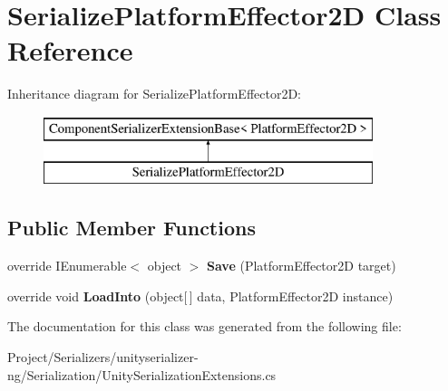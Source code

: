 \hypertarget{class_serialize_platform_effector2_d}{}\section{Serialize\+Platform\+Effector2D Class Reference}
\label{class_serialize_platform_effector2_d}
Inheritance diagram for Serialize\+Platform\+Effector2D\+:\begin{figure}[H]
\begin{center}
\leavevmode
\includegraphics[height=2.000000cm]{class_serialize_platform_effector2_d}
\end{center}
\end{figure}
\subsection*{Public Member Functions}
\begin{DoxyCompactItemize}
\item 
\mbox{\label{class_serialize_platform_effector2_d_a3cc7f3792e67702b2f2e272104353d7e}} 
override I\+Enumerable$<$ object $>$ {\bfseries Save} (Platform\+Effector2D target)
\item 
\mbox{\label{class_serialize_platform_effector2_d_a795aec6c3fcd799843a26c4d8f1520c8}} 
override void {\bfseries Load\+Into} (object\mbox{[}$\,$\mbox{]} data, Platform\+Effector2D instance)
\end{DoxyCompactItemize}


The documentation for this class was generated from the following file\+:\begin{DoxyCompactItemize}
\item 
Project/\+Serializers/unityserializer-\/ng/\+Serialization/Unity\+Serialization\+Extensions.\+cs\end{DoxyCompactItemize}
